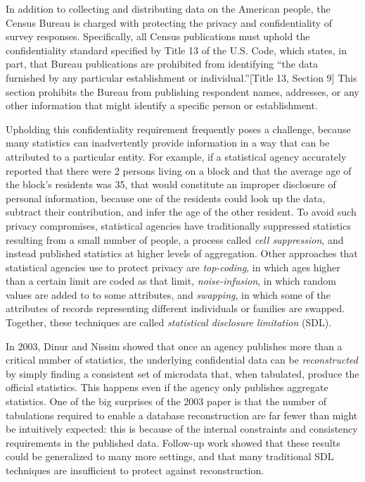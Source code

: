 \documentclass[runningheads]{llncs}
\begin{document}
In addition to collecting and distributing data on the American
people, the Census Bureau is charged with protecting the privacy and confidentiality of
survey responses. Specifically, all Census publications must uphold the
confidentiality standard specified by Title 13 of the U.S. Code, which
states, in part, that Bureau publications are prohibited from
identifying ``the data furnished by any particular
establishment or individual.''[Title 13, Section 9] This section
prohibits the Bureau from publishing respondent names, addresses, or any other
information that might identify a specific person or establishment.

Upholding this confidentiality requirement frequently poses a
challenge, because many statistics can inadvertently provide
information in a way that can be attributed to a particular
entity. For example, if a statistical agency accurately reported that
there were 2 persons living on a block and that the average age of the
block's residents was 35, that would constitute an improper disclosure
of personal information, because one of the residents could look up
the data, subtract their contribution, and infer the age of the other
resident. To avoid such privacy compromises, statistical agencies have
traditionally suppressed statistics resulting from a small number of
people, a process called \emph{cell suppression}, and instead
published statistics at higher levels of aggregation. Other approaches
that statistical agencies use to protect privacy are
\emph{top-coding}, in which ages higher than a certain limit are coded
as that limit, \emph{noise-infusion}, in which random values are added
to to some attributes, and \emph{swapping}, in which some of the
attributes of records representing different individuals or families
are swapped. Together, these techniques are called \emph{statistical
  disclosure limitation} (SDL).

In 2003, Dinur and Nissim showed that 
once an agency publishes more than a critical number of statistics,
the underlying confidential data can be \emph{reconstructed} by simply
finding a consistent set of microdata that, when tabulated, produce
the official statistics. This happens even if the agency only
publishes aggregate statistics. One of the big surprises of the 2003 paper is
that the number of tabulations required to enable a database reconstruction
are far fewer than might be intuitively expected: this is
because of the internal constraints and consistency requirements
in the published data. Follow-up work showed that these results could
be generalized to many more settings, and that many traditional
SDL techniques are insufficient to protect against reconstruction.
\end{document}
